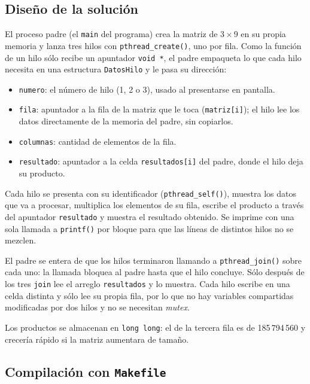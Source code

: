\subsection{Diseño de la solución}
\label{sec:prac03:diseno}

El proceso padre (el \texttt{main} del programa) crea la matriz de $3 \times 9$ en su propia memoria y lanza tres hilos con \texttt{pthread\_create()}, uno por fila. Como la función de un hilo sólo recibe un apuntador \texttt{void *}, el padre empaqueta lo que cada hilo necesita en una estructura \texttt{DatosHilo} y le pasa su dirección:

\begin{itemize}
    \item \texttt{numero}: el número de hilo (1, 2 o 3), usado al presentarse en pantalla.
    \item \texttt{fila}: apuntador a la fila de la matriz que le toca (\texttt{matriz[i]}); el hilo lee los datos directamente de la memoria del padre, sin copiarlos.
    \item \texttt{columnas}: cantidad de elementos de la fila.
    \item \texttt{resultado}: apuntador a la celda \texttt{resultados[i]} del padre, donde el hilo deja su producto.
\end{itemize}

Cada hilo se presenta con su identificador (\texttt{pthread\_self()}), muestra los datos que va a procesar, multiplica los elementos de su fila, escribe el producto a través del apuntador \texttt{resultado} y muestra el resultado obtenido. Se imprime con una sola llamada a \texttt{printf()} por bloque para que las líneas de distintos hilos no se mezclen.

El padre se entera de que los hilos terminaron llamando a \texttt{pthread\_join()} sobre cada uno: la llamada bloquea al padre hasta que el hilo concluye. Sólo después de los tres \texttt{join} lee el arreglo \texttt{resultados} y lo muestra. Cada hilo escribe en una celda distinta y sólo lee su propia fila, por lo que no hay variables compartidas modificadas por dos hilos y no se necesitan \emph{mutex}.

Los productos se almacenan en \texttt{long long}: el de la tercera fila es de 185\,794\,560 y crecería rápido si la matriz aumentara de tamaño.

\subsection{Compilación con \texttt{Makefile}}
\label{sec:prac03:makefile}

